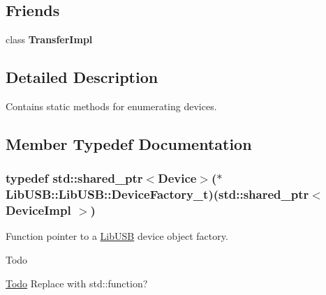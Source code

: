 \subsection*{Friends}
\begin{DoxyCompactItemize}
\item 
\hypertarget{class_lib_u_s_b_1_1_lib_u_s_b_aed9f2bd8ff81bd3986d935f9aa242d1b}{class {\bfseries Transfer\-Impl}}\label{class_lib_u_s_b_1_1_lib_u_s_b_aed9f2bd8ff81bd3986d935f9aa242d1b}

\end{DoxyCompactItemize}


\subsection{Detailed Description}
Contains static methods for enumerating devices. 

\subsection{Member Typedef Documentation}
\hypertarget{class_lib_u_s_b_1_1_lib_u_s_b_a532d474d390477dffd2109e8540be558}{
\subsubsection[{Device\-Factory\-\_\-t}]{\setlength{\rightskip}{0pt plus 5cm}typedef std\-::shared\-\_\-ptr$<${\bf Device}$>$($\ast$ Lib\-U\-S\-B\-::\-Lib\-U\-S\-B\-::\-Device\-Factory\-\_\-t)(std\-::shared\-\_\-ptr$<$ Device\-Impl $>$)}}\label{class_lib_u_s_b_1_1_lib_u_s_b_a532d474d390477dffd2109e8540be558}
Function pointer to a \hyperlink{class_lib_u_s_b_1_1_lib_u_s_b}{Lib\-U\-S\-B} device object factory. \begin{DoxyRefDesc}{Todo}
\item[\hyperlink{todo__todo000001}{Todo}]Replace with std\-::function? \end{DoxyRefDesc}


